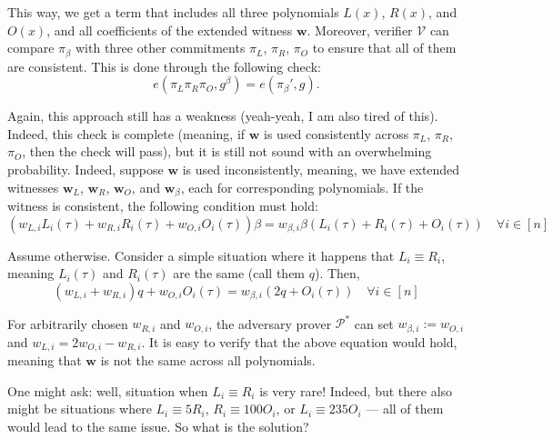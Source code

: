 \documentclass[../lecture-notes-148x210.tex]{subfiles}
\begin{document}
This way, we get a term that includes all three polynomials $L(x)$, $R(x)$, and $O(x)$, and all coefficients of the extended witness $\mathbf{w}$. Moreover, verifier $\mathcal{V}$ can compare $\pi_{\beta}$ with three other commitments $\pi_L$, $\pi_R$, $\pi_O$ to ensure that all of them are consistent. This is done through the following check:
\begin{equation*}
    e(\pi_L\pi_R\pi_O, g^{\beta}) = e(\pi_{\beta}', g).
\end{equation*}

Again, this approach still has a weakness (yeah-yeah, I am also tired of this). Indeed, this check is complete (meaning, if $\mathbf{w}$ is used consistently across $\pi_L$, $\pi_R$, $\pi_O$, then the check will pass), but it is still not sound with an overwhelming probability. Indeed, suppose $\mathbf{w}$ is used inconsistently, meaning, we have extended witnesses $\mathbf{w}_L$, $\mathbf{w}_R$, $\mathbf{w}_O$, and $\mathbf{w}_{\beta}$, each for corresponding polynomials. If the witness is consistent, the following condition must hold:
\begin{equation*}
    (w_{L,i}L_i(\tau) + w_{R,i}R_i(\tau) + w_{O,i}O_i(\tau))\beta = w_{\beta,i}\beta(L_i(\tau) + R_i(\tau) + O_i(\tau)) \quad \forall i \in [n]
\end{equation*}

Assume otherwise. Consider a simple situation where it happens that $L_i \equiv R_i$, meaning $L_i(\tau)$ and $R_i(\tau)$ are the same (call them $q$). Then,
\begin{equation*}
    (w_{L,i} + w_{R,i})q + w_{O,i}O_i(\tau)= w_{\beta,i}(2q + O_i(\tau)) \quad \forall i \in [n]
\end{equation*}

For arbitrarily chosen $w_{R,i}$ and $w_{O,i}$, the adversary prover $\mathcal{P}^*$ can set $w_{\beta,i} := w_{O,i}$ and $w_{L,i}=2w_{O,i} - w_{R,i}$. It is easy to verify that the above equation would hold, meaning that $\mathbf{w}$ is not the same across all polynomials. 

One might ask: well, situation when $L_i \equiv R_i$ is very rare! Indeed, but there also might be situations where $L_i \equiv 5R_i$, $R_i \equiv 100O_i$, or $L_i \equiv 235O_i$ --- all of them would lead to the same issue. So what is the solution? 
\end{document}
